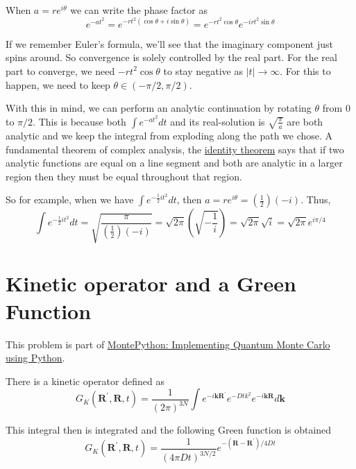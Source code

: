 When $a = re^{i\theta}$ we can write the phase factor as
$$
e^{-at^2} = e^{-rt^2 \left(\cos\theta + i\sin\theta\right)}
= e^{-rt^2 \cos\theta}
    e^{-irt^2 \sin\theta}
$$

If we remember Euler's formula, we'll see that the imaginary component just spins around.
So convergence is solely controlled by the real part.
For the real part to converge, we need $-rt^2 \cos\theta$ to stay negative as $|t| \rightarrow \infty$.
For this to happen, we need to keep $\theta \in \left(-\pi/2, \pi/2\right)$.

With this in mind, we can perform an analytic continuation by rotating $\theta$ from $0$ to $\pi/2$.
This is because both $\int e^{-at^2} dt$ and its real-solution is $\sqrt{\frac{\pi}{a}}$ are both analytic
and we keep the integral from exploding along the path we chose.
A fundamental theorem of complex analysis, the
\href{https://en.wikipedia.org/wiki/Identity_theorem}{identity theorem} says that
if two analytic functions are equal on a line segment and both are analytic in a larger region
then they must be equal throughout that region.

So for example, when we have $\int e^{-\frac{1}{2} it^2} dt$, then
$a = r e^{i\theta} = \left(\frac{1}{2}\right)\left(-i\right)$.
Thus,
$$
\int e^{-\frac{1}{2} it^2} dt = \sqrt{ \frac{\pi}{\left(\frac{1}{2}\right)\left(-i\right)} }
= \sqrt{2\pi} \left(\sqrt{-\frac{1}{i} }\right)
= \sqrt{2\pi} \sqrt{i}
= \sqrt{2\pi} e^{i\pi/4}
$$



\section{Kinetic operator and a Green Function} \label{integral:kinetic-operator}

This problem is part of
\href{https://arxiv.org/abs/physics/0609191}{MontePython: Implementing Quantum Monte Carlo using Python}.

There is a kinetic operator defined as
$$
G_K \left(\mathbf{R}^\prime, \mathbf{R}, t\right) =
\frac{1}{\left(2\pi\right)^{3N}} \int e^{-i\mathbf{k}\mathbf{R}^\prime} e^{-Dtk^2} e^{-i\mathbf{k}\mathbf{R}} d\mathbf{k}
$$

This integral then is integrated and the following Green function is obtained
$$
G_K \left(\mathbf{R}^\prime, \mathbf{R}, t\right) =
\frac{1}{\left(4\pi Dt\right)^{3N/2}} e^{-\left(\mathbf{R}-\mathbf{R}^\prime\right) / 4Dt}
$$

